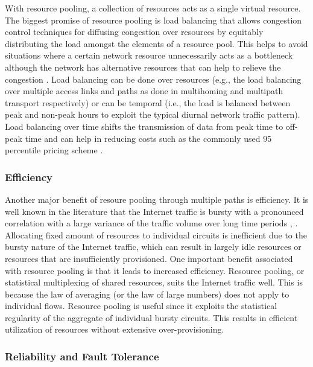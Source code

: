 \documentclass[10pt]{IEEEtran}
\begin{document}
With resource pooling, a collection of resources acts as a single virtual resource. The biggest promise of resource pooling is load balancing that allows congestion control techniques for diffusing congestion over resources by equitably distributing the load amongst the elements of a resource pool. This helps to avoid situations where a certain network resource unnecessarily acts as a bottleneck although the network has alternative resources that can help to relieve the congestion \cite{Valiant1990, zhang2010valiant}. Load balancing can be done over resources (e.g., the load balancing over multiple access links and paths as done in multihoming and multipath transport respectively) or can be temporal (i.e., the load is balanced between peak and non-peak hours to exploit the typical diurnal network traffic pattern). Load balancing over time shifts the transmission of data from peak time to off-peak time and can help in reducing costs such as the commonly used 95 percentile pricing scheme \cite{clegg2014tardis}.


\vspace{1mm}
\subsubsection{Efficiency} 

Another major benefit of resoure pooling through multiple paths is efficiency. It is well known in the literature that the Internet traffic is bursty with a pronounced correlation with a large variance of the traffic volume over long time periods \cite{paxson1995wide}, \cite{leland1994self}. Allocating fixed amount of resources to individual circuits is inefficient due to the bursty nature of the Internet traffic, which can result in largely idle resources or resources that are insufficiently provisioned. One important benefit associated with resource pooling is that it leads to increased efficiency. Resource pooling, or statistical multiplexing of shared resources, suits the Internet traffic well. This is because the law of averaging (or the law of large numbers) does not apply to individual flows. Resource pooling is useful since it exploits the statistical regularity of the aggregate of individual bursty circuits. This results in efficient utilization of resources without extensive over-provisioning.

\vspace{1mm}
\subsubsection{Reliability and Fault Tolerance} 
\end{document}
